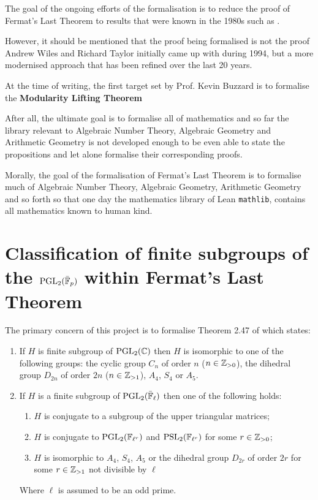 The goal of the ongoing efforts of the formalisation is to reduce the proof of Fermat's Last Theorem to results that were known in the 1980s such as .

However, it should be mentioned that the proof being formalised is not the proof Andrew Wiles and Richard Taylor initially came up with during 1994, but a more modernised approach that has been refined over the last 20 years.

At the time of writing, the first target set by Prof. Kevin Buzzard is to formalise the \textbf{Modularity Lifting Theorem}



After all, the ultimate goal is to formalise all of mathematics and so far the library relevant to Algebraic Number Theory, Algebraic Geometry and Arithmetic Geometry is not developed enough
to be even able to state the propositions and let alone formalise their corresponding proofs.

Morally, the goal of the formalisation of Fermat's Last Theorem is to formalise much of Algebraic Number Theory, Algebraic Geometry, Arithmetic Geometry and so forth so that one day
the mathematics library of Lean \texttt{mathlib}, contains all mathematics known to human kind.



\section{Classification of finite subgroups of the $\operatorname{PGL}_2(\bar{\mathbb{F}}_p)$ within Fermat's Last Theorem}

The primary concern of this project is to formalise Theorem 2.47 of \cite{dtt} which states:

\begin{enumerate}
    \item If $H$ is finite subgroup of $\operatorname{PGL}_2(\mathbb{C})$ then $H$ is isomorphic to one of the following groups: the cyclic group $C_n$ of order $n$ ($n \in \mathbb{Z}_{>0}$), the dihedral group $D_{2n}$ of order $2n$ ($n \in \mathbb{Z}_{>1}$), $A_4$, $S_4$ or $A_5$.
\item If $H$ is a finite subgroup of $\operatorname{PGL}_2(\bar{\mathbb{F}}_\ell)$ then one of the following holds:
\begin{enumerate}
    \item $H$ is conjugate to a subgroup of the upper triangular matrices;
    \item $H$ is conjugate to $\operatorname{PGL}_2(\mathbb{F}_{\ell^r})$ and $\operatorname{PSL}_2(\mathbb{F}_{\ell^{r}})$ for some $r \in \mathbb{Z}_{>0}$;
    \item $H$ is isomorphic to $A_4$, $S_4$, $A_5$ or the dihedral group $D_{2r}$ of order $2r$ for some $r \in \mathbb{Z}_{>1}$ not divisible by $\ell$

\end{enumerate}
    Where $\ell$ is assumed to be an odd prime.
\end{enumerate}

